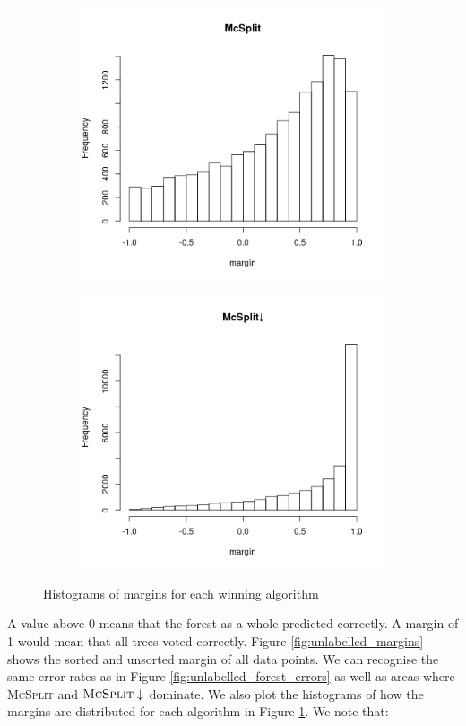 \documentclass{l4proj}
\theoremstyle{definition}
\theoremstyle{remark}
\begin{document}
\begin{figure}
\begin{subfigure}[t]{0.49\textwidth}
    \includegraphics[scale=0.5]{images/mcsplit_hist.png}
  \end{subfigure}
  \begin{subfigure}[t]{0.49\textwidth}
    \centering
    \includegraphics[scale=0.5]{images/mcsplitdown_hist.png}
  \end{subfigure}
  \caption{Histograms of margins for each winning algorithm}
  \label{fig:unlabelled_margin_hist}
\end{figure}

A value above 0 means that the forest as a whole predicted correctly. A margin
of 1 would mean that all trees voted correctly. Figure
\ref{fig:unlabelled_margins} shows the sorted and unsorted margin of all data
points. We can recognise the same error rates as in Figure
\ref{fig:unlabelled_forest_errors} as well as areas where \textsc{McSplit} and
$\textsc{McSplit}\downarrow$ dominate. We also plot the histograms of how the
margins are distributed for each algorithm in Figure
\ref{fig:unlabelled_margin_hist}. We note that:
\end{document}
